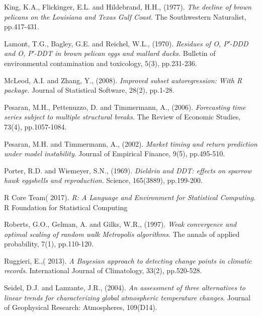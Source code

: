 \documentclass[submit]{smj}
\begin{document}
\begin{thebibliography}{99}
King, K.A., Flickinger, E.L. and Hildebrand, H.H., (1977). 
\textit{The decline of brown pelicans on the Louisiana and Texas Gulf Coast}.
The Southwestern Naturalist, pp.417-431.

Lamont, T.G., Bagley, G.E. and Reichel, W.L., (1970). 
\textit{Residues of O, P′-DDD and O, P′-DDT in brown pelican eggs and mallard ducks.} Bulletin of environmental contamination and toxicology, 5(3), pp.231-236.

McLeod, A.I. and Zhang, Y., (2008).
\textit{ Improved subset autoregression: With R package}. 
 Journal of Statistical Software, 28(2), pp.1-28.

Pesaran, M.H., Pettenuzzo, D. and Timmermann, A., (2006). 
\textit{Forecasting time series subject to multiple structural breaks}. 
The Review of Economic Studies, 73(4), pp.1057-1084.

Pesaran, M.H. and Timmermann, A., (2002).
\textit{Market timing and return prediction under model instability}. 
Journal of Empirical Finance, 9(5), pp.495-510.

Porter, R.D. and Wiemeyer, S.N., (1969). 
\textit{Dieldrin and DDT: effects on sparrow hawk eggshells and reproduction}. 
Science, 165(3889), pp.199-200.

R Core Team( 2017). 
\textit{R: A Language and Environment for Statistical Computing}.
R Foundation for Statistical Computing

Roberts, G.O., Gelman, A. and Gilks, W.R., (1997). 
\textit{Weak convergence and optimal scaling of random walk Metropolis algorithms}. The annals of applied probability, 7(1), pp.110-120.

Ruggieri, E.,( 2013). 
\textit{A Bayesian approach to detecting change points in climatic records}.
International Journal of Climatology, 33(2), pp.520-528.

Seidel, D.J. and Lanzante, J.R., (2004). 
\textit{An assessment of three alternatives to linear trends for characterizing global atmospheric temperature changes}. 
Journal of Geophysical Research: Atmospheres, 109(D14). 


\end{thebibliography}
\end{document}
